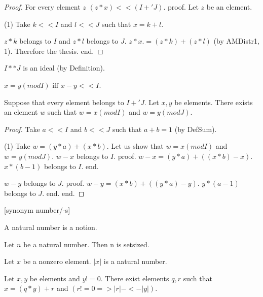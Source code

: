\documentclass{article}
\begin{document}
\begin{forthel}
\begin{proof}
      For every element $z$ $(z * x) << (I +' J)$.
      proof.
        Let $z$ be an element.

        (1) Take $k << I$ and $l << J$ such that $x = k + l$.

        $z * k$ belongs to $I$ and $z * l$ belongs to $J$. $z * x .= (z * k) + (z * l)$ (by AMDistr1, 1). Therefore the thesis.
      end.
    \end{proof}


    \begin{lemma}[IdeInt]
      $I ** J$ is an ideal (by Definition).
    \end{lemma}

    \begin{definition}[DefMod]
      $x = y (mod I)$ iff $x - y << I$.
    \end{definition}

    \begin{theorem}[ChineseRemainder]
      Suppose that every element belongs to $I +' J$. Let $x, y$ be elements. There exists an element $w$ such that $w = x (mod I)$ and $w = y (mod J)$.
    \end{theorem}
    \begin{proof}
      Take $a << I$ and $b << J$ such that $a + b = 1$ (by DefSum).

      (1) Take $w = (y * a) + (x * b)$.
      Let us show that $w = x (mod I)$ and $w = y (mod J)$.
        $w - x$ belongs to $I$.
        proof.
          $w - x = (y * a) + ((x * b) - x)$. $x * (b - 1)$ belongs to $I$.
        end.

        $w - y$ belongs to $J$.
        proof.
          $w - y = (x * b) + ((y * a) - y)$. $y * (a - 1)$ belongs to $J$.
        end.
      end.
    \end{proof}


    [synonym number/-s]

    \begin{signature}[NatSort]
      A natural number is a notion.
    \end{signature}

    \begin{axiom}
      Let $n$ be a natural number. Then n is setsized.
    \end{axiom}

    \begin{signature}[EucSort]
      Let $x$ be a nonzero element. $|x|$ is a natural number.
    \end{signature}

    \begin{axiom}[Division]
      Let $x,y$ be elements and $y != 0$. There exist elements $q,r$ such that $x = (q * y) + r$ and $(r != 0 => |r| -<- |y|)$.
    \end{axiom}



\end{forthel}
\end{document}
